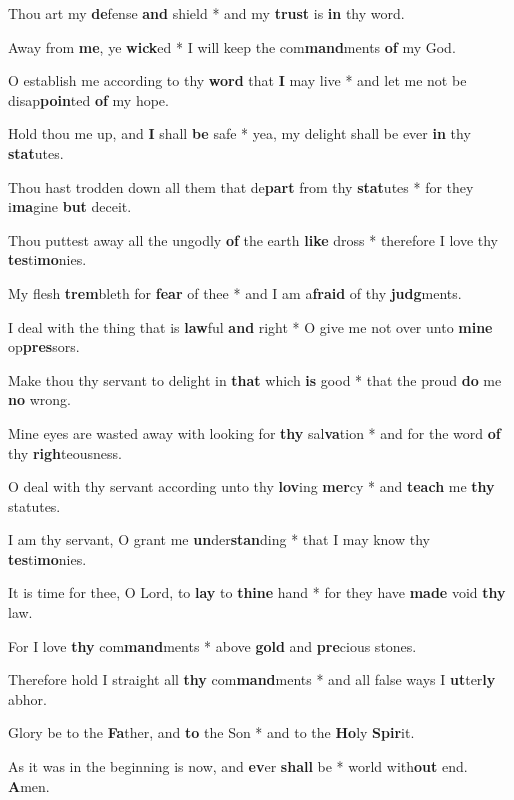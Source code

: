 \begin{multicols}{2}
	Thou art my \textbf{de}fense \textbf{and} shield * and my \textbf{trust} is \textbf{in} thy word.
	
	Away from \textbf{me}, ye \textbf{wick}ed * I will keep the com\textbf{mand}ments \textbf{of} my God.
	
	O establish me according to thy \textbf{word} that \textbf{I} may live * and let me not be disap\textbf{poin}ted \textbf{of} my hope.
	
	Hold thou me up, and \textbf{I} shall \textbf{be} safe * yea, my delight shall be ever \textbf{in} thy \textbf{stat}utes.
	
	Thou hast trodden down all them that de\textbf{part} from thy \textbf{stat}utes * for they i\textbf{ma}gine \textbf{but} deceit.
	
	Thou puttest away all the ungodly \textbf{of} the earth \textbf{like} dross * therefore I love thy \textbf{tes}ti\textbf{mo}nies.
	
	My flesh \textbf{trem}bleth for \textbf{fear} of thee * and I am a\textbf{fraid} of thy \textbf{judg}ments.
	
	I deal with the thing that is \textbf{law}ful \textbf{and} right * O give me not over unto \textbf{mine} op\textbf{pres}sors.
	
	Make thou thy servant to delight in \textbf{that} which \textbf{is} good * that the proud \textbf{do} me \textbf{no} wrong.
	
	Mine eyes are wasted away with looking for \textbf{thy} sal\textbf{va}tion * and for the word \textbf{of} thy \textbf{righ}teousness.
	
	O deal with thy servant according unto thy \textbf{lov}ing \textbf{mer}cy * and \textbf{teach} me \textbf{thy} statutes.
	
	I am thy servant, O grant me \textbf{un}der\textbf{stan}ding * that I may know thy \textbf{tes}ti\textbf{mo}nies.
	
	It is time for thee, O Lord, to \textbf{lay} to \textbf{thine} hand * for they have \textbf{made} void \textbf{thy} law.
	
	For I love \textbf{thy} com\textbf{mand}ments * above \textbf{gold} and \textbf{pre}cious stones.
	
	Therefore hold I straight all \textbf{thy} com\textbf{mand}ments * and all false ways I \textbf{ut}ter\textbf{ly} abhor. 
	
	Glory be to the \textbf{Fa}ther, and \textbf{to} the Son * and to the \textbf{Ho}ly \textbf{Spir}it.
	
	As it was in the beginning is now, and \textbf{ev}er \textbf{shall} be * world with\textbf{out} end. \textbf{A}men.
\end{multicols}